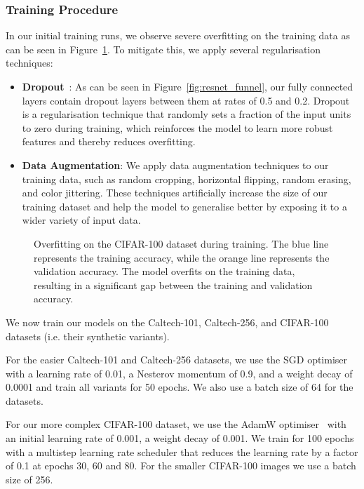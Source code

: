 \subsubsection{Training Procedure}

In our initial training runs,
we observe severe overfitting on the training data as can be seen in Figure~\ref{fig:overfitting}.
To mitigate this, we apply several regularisation techniques:
\begin{itemize}
      \item \textbf{Dropout}~\cite{hinton_improving_2012}:
            As can be seen in Figure~\ref{fig:resnet_funnel},
            our fully connected layers contain dropout layers between them at rates of 0.5 and 0.2.
            Dropout is a regularisation technique that randomly sets a fraction of the input units to zero during training,
            which reinforces the model to learn more robust features and thereby reduces overfitting.
      \item \textbf{Data Augmentation}:
            We apply data augmentation techniques to our training data,
            such as random cropping, horizontal flipping, random erasing, and color jittering.
            These techniques artificially increase the size of our training dataset
            and help the model to generalise better by exposing it to a wider variety of input data.
\end{itemize}

\begin{figure}[ht]
      \centering
      \scalebox{0.6}{}
      \caption{Overfitting on the CIFAR-100 dataset during training.
            The blue line represents the training accuracy,
            while the orange line represents the validation accuracy.
            The model overfits on the training data, resulting in a significant gap
            between the training and validation accuracy.}
      \label{fig:overfitting}
\end{figure}

We now train our models on the Caltech-101, Caltech-256, and CIFAR-100 datasets
(i.e. their synthetic variants).

For the easier Caltech-101 and Caltech-256 datasets,
we use the SGD optimiser~\cite{sutskever_importance_2013} with a learning rate of 0.01,
a Nesterov momentum of 0.9, and a weight decay of 0.0001 and train all variants for 50 epochs.
We also use a batch size of 64 for the datasets.

For our more complex CIFAR-100 dataset,
we use the AdamW optimiser~\cite{loshchilov_decoupled_2017} with an initial learning rate of 0.001, a weight decay of 0.001.
We train for 100 epochs with a multistep learning rate scheduler that reduces the learning rate by a factor of 0.1 at epochs 30, 60 and 80.
For the smaller CIFAR-100 images we use a batch size of 256.


